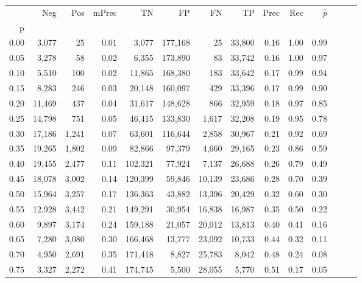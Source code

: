 \begin{tabular}{rrrrrrrrrrrrrr}
\toprule
{} &     Neg &    Pos & mPrec &       TN &       FP &      FN &      TP &  Prec &   Rec & $\hat{p}$ \\
p    &         &        &       &          &          &         &         &       &       &           \\
\midrule
0.00 &   3,077 &     25 &  0.01 &    3,077 &  177,168 &      25 &  33,800 &  0.16 &  1.00 &      0.99 \\
0.05 &   3,278 &     58 &  0.02 &    6,355 &  173,890 &      83 &  33,742 &  0.16 &  1.00 &      0.97 \\
0.10 &   5,510 &    100 &  0.02 &   11,865 &  168,380 &     183 &  33,642 &  0.17 &  0.99 &      0.94 \\
0.15 &   8,283 &    246 &  0.03 &   20,148 &  160,097 &     429 &  33,396 &  0.17 &  0.99 &      0.90 \\
0.20 &  11,469 &    437 &  0.04 &   31,617 &  148,628 &     866 &  32,959 &  0.18 &  0.97 &      0.85 \\
0.25 &  14,798 &    751 &  0.05 &   46,415 &  133,830 &   1,617 &  32,208 &  0.19 &  0.95 &      0.78 \\
0.30 &  17,186 &  1,241 &  0.07 &   63,601 &  116,644 &   2,858 &  30,967 &  0.21 &  0.92 &      0.69 \\
0.35 &  19,265 &  1,802 &  0.09 &   82,866 &   97,379 &   4,660 &  29,165 &  0.23 &  0.86 &      0.59 \\
0.40 &  19,455 &  2,477 &  0.11 &  102,321 &   77,924 &   7,137 &  26,688 &  0.26 &  0.79 &      0.49 \\
0.45 &  18,078 &  3,002 &  0.14 &  120,399 &   59,846 &  10,139 &  23,686 &  0.28 &  0.70 &      0.39 \\
0.50 &  15,964 &  3,257 &  0.17 &  136,363 &   43,882 &  13,396 &  20,429 &  0.32 &  0.60 &      0.30 \\
0.55 &  12,928 &  3,442 &  0.21 &  149,291 &   30,954 &  16,838 &  16,987 &  0.35 &  0.50 &      0.22 \\
0.60 &   9,897 &  3,174 &  0.24 &  159,188 &   21,057 &  20,012 &  13,813 &  0.40 &  0.41 &      0.16 \\
0.65 &   7,280 &  3,080 &  0.30 &  166,468 &   13,777 &  23,092 &  10,733 &  0.44 &  0.32 &      0.11 \\
0.70 &   4,950 &  2,691 &  0.35 &  171,418 &    8,827 &  25,783 &   8,042 &  0.48 &  0.24 &      0.08 \\
0.75 &   3,327 &  2,272 &  0.41 &  174,745 &    5,500 &  28,055 &   5,770 &  0.51 &  0.17 &      0.05 \\

\end{tabular}
